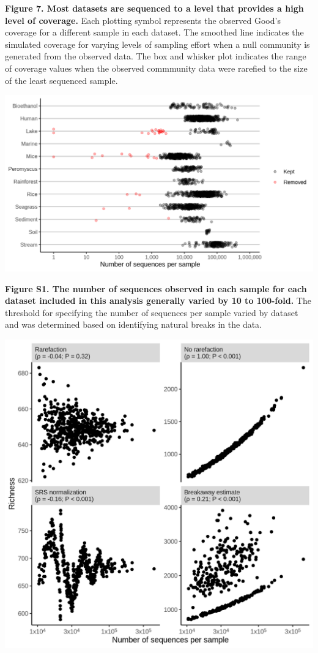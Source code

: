 \documentclass[
]{article}
\begin{document}
\textbf{Figure 7. Most datasets are sequenced to a level that provides a
high level of coverage.} Each plotting symbol represents the observed
Good's coverage for a different sample in each dataset. The smoothed
line indicates the simulated coverage for varying levels of sampling
effort when a null community is generated from the observed data. The
box and whisker plot indicates the range of coverage values when the
observed commmunity data were rarefied to the size of the least
sequenced sample.

\newpage

\includegraphics{figure_s1.png}

\textbf{Figure S1. The number of sequences observed in each sample for
each dataset included in this analysis generally varied by 10 to
100-fold.} The threshold for specifying the number of sequences per
sample varied by dataset and was determined based on identifying natural
breaks in the data.

\newpage

\includegraphics{figure_s2.png}
\end{document}
